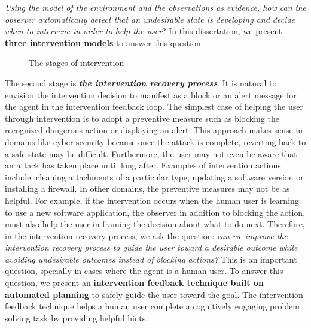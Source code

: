 \textit{Using the model of the environment and the observations as evidence, how can the observer automatically detect that an undesirable state is developing and decide when to intervene in order to help the user}? In this dissertation, we present \textbf{three intervention models} to answer this question.
\begin{figure}[ptb]
   \caption{The stages of intervention}
\label{fig:stages}
\end{figure}
The second stage is \textit{\textbf{the intervention recovery process}}. 
It is natural to envision the intervention decision to manifest as a block or an alert message for the agent in the intervention feedback loop. 
The simplest case of helping the user through intervention is to adopt a preventive measure such as blocking the recognized dangerous action or displaying an alert.
This approach makes sense in domains like cyber-security because once the attack is complete, reverting back to a safe state may be difficult. 
Furthermore, the user may not even be aware that an attack has taken place until long after. 
Examples of intervention actions include: cleaning attachments of a particular type, updating a software version or installing a firewall. 
In other domains, the preventive measures may not be as helpful. 
For example, if the intervention occurs when the human user is learning to use a new software application, the observer in addition to blocking the action, must also help the user in framing the decision about what to do next.
Therefore, in the intervention recovery process, we ask the question: \textit{can we improve the intervention recovery process to guide the user toward a desirable outcome while avoiding undesirable outcomes instead of blocking actions?} 
This is an important question, specially in cases where the agent is a human user. 
To answer this question, we present an \textbf{intervention feedback technique built on automated planning} to safely guide the user toward the goal.
The intervention feedback technique helps a human user complete a cognitively engaging problem solving task by providing helpful hints. 
